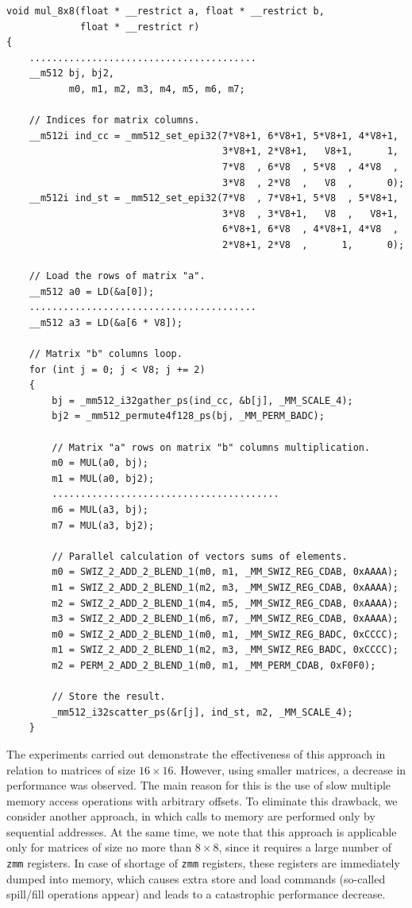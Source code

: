\documentclass[
11pt,%
tightenlines,%
twoside,%
onecolumn,%
nofloats,%
nobibnotes,%
nofootinbib,%
superscriptaddress,%
noshowpacs,%
centertags]%
{revtex4}
\begin{document}
\begin{lstlisting}[caption={Direct approach to \texttt{mul\_8x8} implementation.},label={lst:mul1}]
void mul_8x8(float * __restrict a, float * __restrict b,
             float * __restrict r)
{
    ........................................
    __m512 bj, bj2,
           m0, m1, m2, m3, m4, m5, m6, m7;

    // Indices for matrix columns.
    __m512i ind_cc = _mm512_set_epi32(7*V8+1, 6*V8+1, 5*V8+1, 4*V8+1,
                                      3*V8+1, 2*V8+1,   V8+1,      1,
                                      7*V8  , 6*V8  , 5*V8  , 4*V8  ,
                                      3*V8  , 2*V8  ,   V8  ,      0);
    __m512i ind_st = _mm512_set_epi32(7*V8  , 7*V8+1, 5*V8  , 5*V8+1,
                                      3*V8  , 3*V8+1,   V8  ,   V8+1,
                                      6*V8+1, 6*V8  , 4*V8+1, 4*V8  ,
                                      2*V8+1, 2*V8  ,      1,      0);

    // Load the rows of matrix "a".
    __m512 a0 = LD(&a[0]);
    ........................................
    __m512 a3 = LD(&a[6 * V8]);

    // Matrix "b" columns loop.
    for (int j = 0; j < V8; j += 2)
    {
        bj = _mm512_i32gather_ps(ind_cc, &b[j], _MM_SCALE_4);
        bj2 = _mm512_permute4f128_ps(bj, _MM_PERM_BADC);

        // Matrix "a" rows on matrix "b" columns multiplication.
        m0 = MUL(a0, bj);
        m1 = MUL(a0, bj2);
        ........................................
        m6 = MUL(a3, bj);
        m7 = MUL(a3, bj2);

        // Parallel calculation of vectors sums of elements.
        m0 = SWIZ_2_ADD_2_BLEND_1(m0, m1, _MM_SWIZ_REG_CDAB, 0xAAAA);
        m1 = SWIZ_2_ADD_2_BLEND_1(m2, m3, _MM_SWIZ_REG_CDAB, 0xAAAA);
        m2 = SWIZ_2_ADD_2_BLEND_1(m4, m5, _MM_SWIZ_REG_CDAB, 0xAAAA);
        m3 = SWIZ_2_ADD_2_BLEND_1(m6, m7, _MM_SWIZ_REG_CDAB, 0xAAAA);
        m0 = SWIZ_2_ADD_2_BLEND_1(m0, m1, _MM_SWIZ_REG_BADC, 0xCCCC);
        m1 = SWIZ_2_ADD_2_BLEND_1(m2, m3, _MM_SWIZ_REG_BADC, 0xCCCC);
        m2 = PERM_2_ADD_2_BLEND_1(m0, m1, _MM_PERM_CDAB, 0xF0F0);

        // Store the result.
        _mm512_i32scatter_ps(&r[j], ind_st, m2, _MM_SCALE_4);
    }
\end{lstlisting}

The experiments carried out demonstrate the effectiveness of this approach in relation to matrices of size $16 \times 16$.
However, using smaller matrices, a decrease in performance was observed.
The main reason for this is the use of slow multiple memory access operations with arbitrary offsets.
To eliminate this drawback, we consider another approach, in which calls to memory are performed only by sequential addresses.
At the same time, we note that this approach is applicable only for matrices of size no more than $8 \times 8$, since it requires a large number of \texttt{zmm} registers.
In case of shortage of \texttt{zmm} registers, these registers are immediately dumped into memory, which causes extra store and load commands (so-called spill/fill operations appear) and leads to a catastrophic performance decrease.
\end{document}
